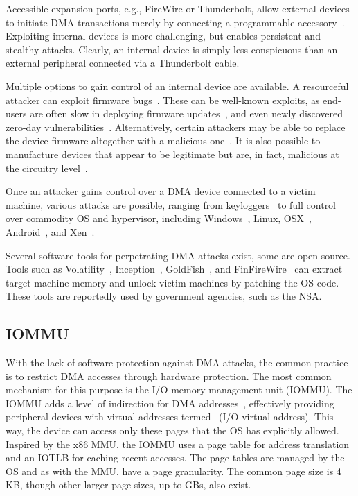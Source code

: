 Accessible expansion ports, e.g., FireWire or Thunderbolt, allow external devices to initiate DMA transactions merely by connecting a programmable accessory~\cite{Dor04, Vol, MM, thunder}. 
Exploiting internal devices is more challenging, but enables persistent and stealthy attacks. Clearly, an internal device is simply less conspicuous than an external peripheral connected via a Thunderbolt cable.

Multiple options to gain control of an internal device are available.
A resourceful attacker can exploit firmware bugs~\cite{SB12}. These can be well-known exploits, as end-users are often slow in deploying firmware updates~\cite{DPVL10}, and even newly discovered zero-day vulnerabilities~\cite{Ben17b}. Alternatively, certain attackers may be able to replace the device firmware altogether with a malicious one~\cite{ZKB13, NL14}. It is also possible to manufacture devices that appear to be legitimate but are, in fact, malicious at the circuitry level~\cite{YHD16}.

Once an attacker gains control over a DMA device connected to a victim machine, various attacks are possible, ranging from keyloggers~\cite{LKV13, SB12} to full control over commodity OS and hypervisor, including Windows~\cite{AD10,thunder}, Linux, OSX~\cite{Fri16, thunder}, Android~\cite{Ben17b}, and Xen~\cite{Woj08}.

Several software tools for perpetrating DMA attacks exist, some are open source. Tools such as Volatility~\cite{Vol}, Inception~\cite{MM}, GoldFish~\cite{GA10}, and FinFireWire~\cite{Fin14} can extract target machine memory and unlock victim machines by patching the OS code. These tools are reportedly used by government agencies, such as the NSA.

\subsection{IOMMU}

With the lack of software protection against DMA attacks, the common practice is to restrict DMA accesses through hardware protection. The most common mechanism for this purpose is the I/O memory management unit (IOMMU). The IOMMU adds a level of indirection for DMA addresses~\cite{WRC08,YZ15,SB12,MTF12}, effectively providing peripheral devices with virtual addresses termed~\iova{} (I/O virtual address). This way, the device can access only these pages that the OS has explicitly allowed. Inspired by the x86 MMU, the IOMMU uses a page table for address translation and an IOTLB for caching recent accesses.  The page tables are managed by the OS and as with the MMU, have a page granularity. The common page size is 4\,KB, though other larger page sizes, up to GBs, also exist.

